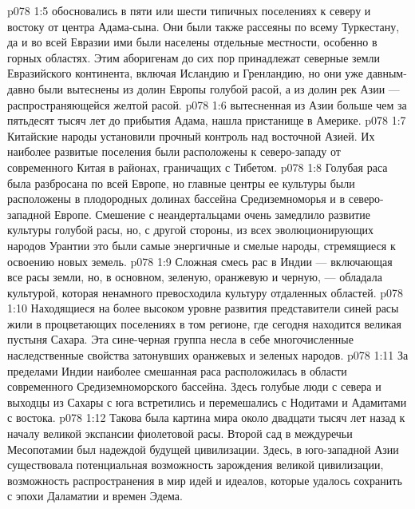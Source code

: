\vs p078 1:5 \pc {}\bibnobreakspace {} обосновались в пяти или шести типичных поселениях к северу и востоку от центра Адама\hyp{}сына. Они были также рассеяны по всему Туркестану, да и во всей Евразии ими были населены отдельные местности, особенно в горных областях. Этим аборигенам до сих пор принадлежат северные земли Евразийского континента, включая Исландию и Гренландию, но они уже давным\hyp{}давно были вытеснены из долин Европы голубой расой, а из долин рек Азии --- распространяющейся желтой расой.
\vs p078 1:6 \pc {}\bibnobreakspace {} вытесненная из Азии больше чем за пятьдесят тысяч лет до прибытия Адама, нашла пристанище в Америке.
\vs p078 1:7 \pc {}\bibnobreakspace {} Китайские народы установили прочный контроль над восточной Азией. Их наиболее развитые поселения были расположены к северо\hyp{}западу от современного Китая в районах, граничащих с Тибетом.
\vs p078 1:8 \pc {}\bibnobreakspace {} Голубая раса была разбросана по всей Европе, но главные центры ее культуры были расположены в плодородных долинах бассейна Средиземноморья и в северо\hyp{}западной Европе. Смешение с неандертальцами очень замедлило развитие культуры голубой расы, но, с другой стороны, из всех эволюционирующих народов Урантии это были самые энергичные и смелые народы, стремящиеся к освоению новых земель.
\vs p078 1:9 \pc {}\bibnobreakspace {} Сложная смесь рас в Индии --- включающая все расы земли, но, в основном, зеленую, оранжевую и черную, --- обладала культурой, которая ненамного превосходила культуру отдаленных областей.
\vs p078 1:10 \pc {}\bibnobreakspace {} Находящиеся на более высоком уровне развития представители синей расы жили в процветающих поселениях в том регионе, где сегодня находится великая пустыня Сахара. Эта сине\hyp{}черная группа несла в себе многочисленные наследственные свойства затонувших оранжевых и зеленых народов.
\vs p078 1:11 \pc {}\bibnobreakspace {} За пределами Индии наиболее смешанная раса расположилась в области современного Средиземноморского бассейна. Здесь голубые люди с севера и выходцы из Сахары с юга встретились и перемешались с Нодитами и Адамитами с востока.
\vs p078 1:12 \pc Такова была картина мира около двадцати тысяч лет назад к началу великой экспансии фиолетовой расы. Второй сад в междуречьи Месопотамии был надеждой будущей цивилизации. Здесь, в юго\hyp{}западной Азии существовала потенциальная возможность зарождения великой цивилизации, возможность распространения в мир идей и идеалов, которые удалось сохранить с эпохи Даламатии и времен Эдема.
